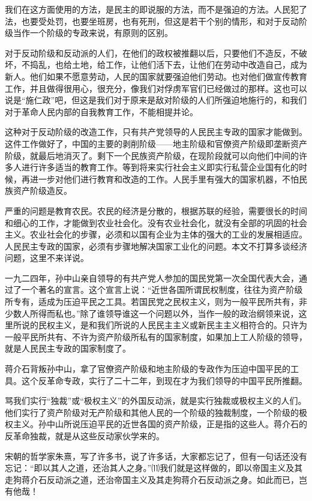 \documentclass[UTF-8, a5paper, 12pt]{ctexart}
\begin{document}
我们在这方面使用的方法，是民主的即说服的方法，而不是强迫的方法。人民犯了法，也要受处罚，也要坐班房，也有死刑，但这是若干个别的情形，和对于反动阶级当作一个阶级的专政来说，有原则的区别。

对于反动阶级和反动派的人们，在他们的政权被推翻以后，只要他们不造反，不破坏，不捣乱，也给土地，给工作，让他们活下去，让他们在劳动中改造自己，成为新人。他们如果不愿意劳动，人民的国家就要强迫他们劳动。也对他们做宣传教育工作，并且做得很用心，很充分，像我们对俘虏军官们已经做过的那样。这也可以说是“施仁政”吧，但这是我们对于原来是敌对阶级的人们所强迫地施行的，和我们对于革命人民内部的自我教育工作，不能相提并论。

这种对于反动阶级的改造工作，只有共产党领导的人民民主专政的国家才能做到。这件工作做好了，中国的主要的剥削阶级——地主阶级和官僚资产阶级即垄断资产阶级，就最后地消灭了。剩下一个民族资产阶级，在现阶段就可以向他们中间的许多人进行许多适当的教育工作。等到将来实行社会主义即实行私营企业国有化的时候，再进一步对他们进行教育和改造的工作。人民手里有强大的国家机器，不怕民族资产阶级造反。

严重的问题是教育农民。农民的经济是分散的，根据苏联的经验，需要很长的时间和细心的工作，才能做到农业社会化。没有农业社会化，就没有全部的巩固的社会主义。农业社会化的步骤，必须和以国有企业为主体的强大的工业的发展相适应。人民民主专政的国家，必须有步骤地解决国家工业化的问题。本文不打算多谈经济问题，这里不来详说。

一九二四年，孙中山亲自领导的有共产党人参加的国民党第一次全国代表大会，通过了一个著名的宣言。这个宣言上说：“近世各国所谓民权制度，往往为资产阶级所专有，适成为压迫平民之工具。若国民党之民权主义，则为一般平民所共有，非少数人所得而私也。”除了谁领导谁这一个问题以外，当作一般的政治纲领来说，这里所说的民权主义，是和我们所说的人民民主主义或新民主主义相符合的。只许为一般平民所共有、不许为资产阶级所私有的国家制度，如果加上工人阶级的领导，就是人民民主专政的国家制度了。

蒋介石背叛孙中山，拿了官僚资产阶级和地主阶级的专政作为压迫中国平民的工具。这个反革命专政，实行了二十二年，到现在才为我们领导的中国平民所推翻。

骂我们实行“独裁”或“极权主义”的外国反动派，就是实行独裁或极权主义的人们。他们实行了资产阶级对无产阶级和其他人民的一个阶级的独裁制度，一个阶级的极权主义。孙中山所说压迫平民的近世各国的资产阶级，正是指的这些人。蒋介石的反革命独裁，就是从这些反动家伙学来的。

宋朝的哲学家朱熹，写了许多书，说了许多话，大家都忘记了，但有一句话还没有忘记：“即以其人之道，还治其人之身。”⑾我们就是这样做的，即以帝国主义及其走狗蒋介石反动派之道，还治帝国主义及其走狗蒋介石反动派之身。如此而已，岂有他哉！
\end{document}
